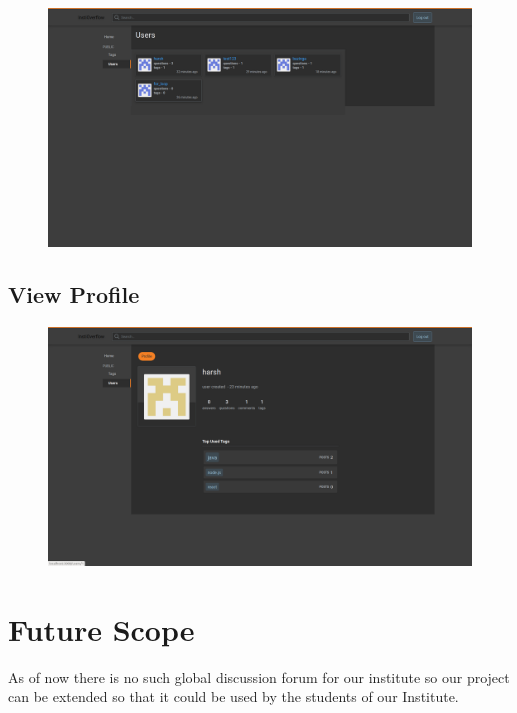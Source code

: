 \documentclass[12pt]{article}
\begin{document}
\begin{figure}[H]
\begin{center}
\includegraphics[width=0.75\columnwidth]{Users}
\end{center}
\end{figure}

\subsection{View Profile}


\begin{figure}[H]
\begin{center}
\includegraphics[width=0.75\columnwidth]{User}
\end{center}
\end{figure}



\section{Future Scope}

As of now there is no such global discussion forum for our institute so our project can be extended so that it could be used by the students of our Institute. 
\end{document}
